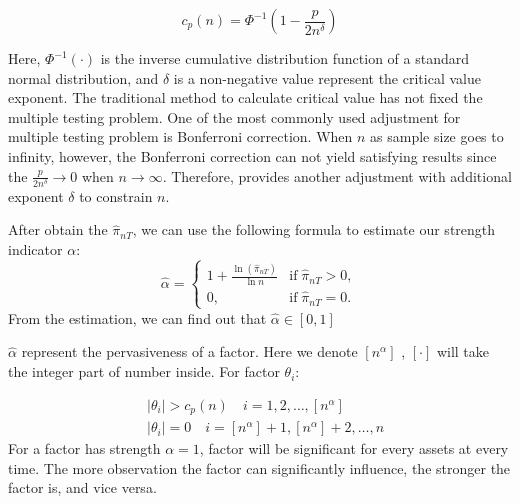 \documentclass[12pt]{article}
\begin{document}
\[   c_p(n) = \Phi^{-1}(1 - \frac{p}{2n^\delta})   \tag{3} \label{critical_value_function} \]

Here, $\Phi^{-1}(\cdot)$ is the inverse cumulative distribution function of a standard normal distribution, and $\delta$ is a non-negative value represent the critical value exponent. 
The traditional method to calculate critical value has not fixed the multiple testing problem. One of the most commonly used adjustment for multiple testing problem is Bonferroni correction. When $n$ as sample size goes to infinity, however, the Bonferroni correction can not yield satisfying results since the $\frac{p}{2n^{\delta}} \to 0$ when $n \to \infty$. Therefore,  provides another adjustment with additional exponent $\delta$ to constrain $n$.

 After obtain the $\hat{\pi}_{nT}$, we can use the following formula to estimate our strength indicator $\alpha$:
\[ \hat{\alpha} = \begin{cases}
1+\frac{\ln(\hat{\pi}_{nT})}{\ln n} & \text{if}\; \hat{\pi}_{nT} > 0,\\
	0, & \text{if}\; \hat{\pi}_{nT} = 0.
\end{cases} \]
From the estimation, we can find out that $\hat{\alpha} \in [0,1]$

$\hat{\alpha}$ represent the pervasiveness of a factor. Here we denote $[n^{\alpha}]$ , $[\cdot]$ will take the integer part of number inside. For factor $\theta_{i}$:

\begin{align*}
&|\theta_{i}| > c_p(n)\quad i = 1, 2,  \dots, [n^{\alpha}]\\
&|\theta_{i}| = 0 \quad i = [n^{\alpha}] + 1, [n^{\alpha}] +2 ,\dots, n
\end{align*}
For a factor has strength $\alpha = 1$,  factor will be significant  for every assets at every time. The more observation the factor can significantly influence, the stronger the factor is, and vice versa.\textsl{}


\newpage


\end{document}
